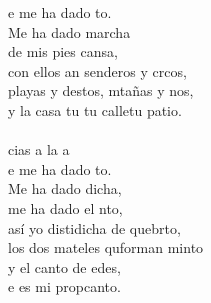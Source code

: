 \begin{cancion}
	e me ha dado to.\\
	Me ha dado marcha \\
	de mis pies cansa,\\
	con ellos an senderos y crcos,\\
	playas y destos, mtañas y nos,\\
	y la casa tu tu calletu patio.\\
\jump\\
	cias a la a \\
	e me ha dado to.\\
	Me ha dado dicha, \\
	me ha dado el nto,\\
	así yo distidicha de quebrto,\\
	los dos mateles quforman minto\\
	y el canto de edes, \\
	e es mi propcanto.\\
\end{cancion}%

